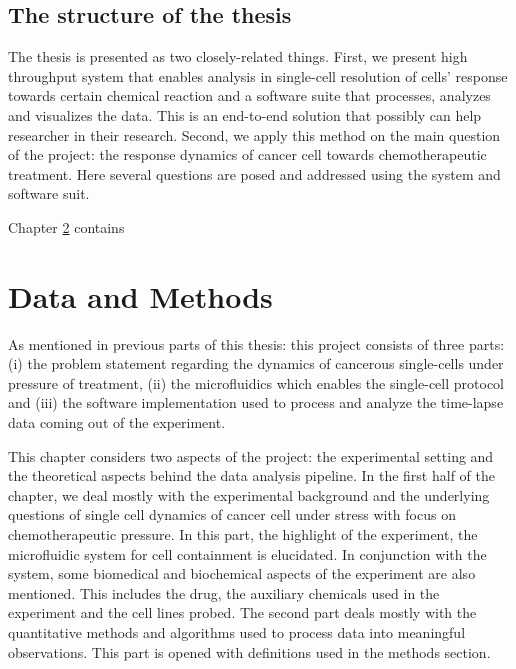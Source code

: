 \documentclass[pdftex,12pt,a4paper]{report}
\begin{document}
\section{The structure of the thesis}


The thesis is presented as two closely-related things. First, we present high throughput system that enables analysis in single-cell resolution of cells' response towards certain chemical reaction and a software suite that processes, analyzes and visualizes the data. This is an end-to-end solution that possibly can help researcher in their research. Second, we apply this method on the main question of the project: the response dynamics of cancer cell towards chemotherapeutic treatment. Here several questions are posed and addressed using the system and software suit.



Chapter \ref{chapter:data_and_method} contains %

\chapter{Data and Methods}

\label{chapter:data_and_method}

As mentioned in previous parts of this thesis: this project consists of three parts: (i) the problem statement regarding the dynamics of cancerous single-cells under pressure of treatment, (ii) the microfluidics which enables the single-cell protocol and (iii) the software implementation used to process and analyze the time-lapse data coming out of the experiment.

This chapter considers two aspects of the project: the experimental setting and the theoretical aspects behind the data analysis pipeline. In the first half of the chapter, we deal mostly with the experimental background and the underlying questions of single cell dynamics of cancer cell under stress with focus on chemotherapeutic pressure. In this part, the highlight of the experiment, the microfluidic system for cell containment is elucidated. In conjunction with the system, some biomedical and biochemical aspects of the experiment are also mentioned. This includes the drug, the auxiliary chemicals used in the experiment and the cell lines probed. The second part deals mostly with the quantitative methods and algorithms used to process data into meaningful observations. This part is opened with definitions used in the methods section.
\end{document}
